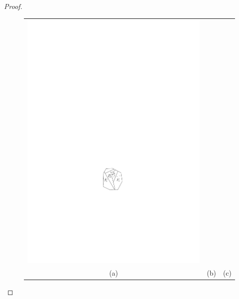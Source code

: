 \documentclass{article}
\begin{document}
\begin{proof}
\begin{figure}
\begin{center}
\begin{tabular}{ccc}
      \includegraphics{chop-c}  \\  
      (a) & (b) & (c) \\[1ex]

\end{tabular}
\end{center}
\end{figure}
\end{proof}
\end{document}
